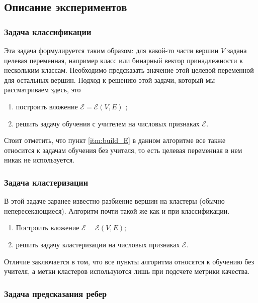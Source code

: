 \documentclass[12pt,a4paper]{extarticle}
\newcommand{\E}{\mathcal{E}}
\begin{document}
    \subsection{Описание экспериментов}
    
    \subsubsection{Задача классификации}
    
    Эта задача формулируется таким образом: для какой-то части вершин $V$ задана целевая переменная, например класс или бинарный вектор принадлежности к нескольким классам. Необходимо предсказать значение этой целевой переменной для остальных вершин.
    Подход к решению этой задачи, который мы рассматриваем здесь, это 
    \begin{enumerate}
        \item построить вложение $\E = \E(V, E)$ \label{itm:build_E};
        \item решить задачу обучения с учителем на числовых признаках $\E$.
    \end{enumerate}
    
    Стоит отметить, что пункт \ref{itm:build_E} в данном алгоритме все также относится к задачам обучения без учителя, то есть целевая переменная в нем никак не используется.
    
    \subsubsection{Задача кластеризации}
    
    В этой задаче заранее известно разбиение вершин на кластеры (обычно непересекающиеся). Алгоритм почти такой же как и при классификации.
    
    \begin{enumerate}
        \item Построить вложение $\E = \E(V, E)$;
        \item решить задачу кластеризации на числовых признаках $\E$.
    \end{enumerate}
    
    Отличие заключается в том, что все пункты алгоритма относятся к обучению без учителя, а метки кластеров используются лишь при подсчете метрики качества.
    
    \subsubsection{Задача предсказания ребер}
    
\end{document}

